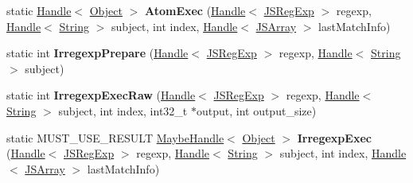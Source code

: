 \begin{DoxyCompactItemize}
\item 
\hypertarget{classv8_1_1internal_1_1_reg_exp_impl_a427c7da5f3edc644caa8f1332d113b11}{}static \hyperlink{classv8_1_1internal_1_1_handle}{Handle}$<$ \hyperlink{classv8_1_1internal_1_1_object}{Object} $>$ {\bfseries Atom\+Exec} (\hyperlink{classv8_1_1internal_1_1_handle}{Handle}$<$ \hyperlink{classv8_1_1internal_1_1_j_s_reg_exp}{J\+S\+Reg\+Exp} $>$ regexp, \hyperlink{classv8_1_1internal_1_1_handle}{Handle}$<$ \hyperlink{classv8_1_1internal_1_1_string}{String} $>$ subject, int index, \hyperlink{classv8_1_1internal_1_1_handle}{Handle}$<$ \hyperlink{classv8_1_1internal_1_1_j_s_array}{J\+S\+Array} $>$ last\+Match\+Info)\label{classv8_1_1internal_1_1_reg_exp_impl_a427c7da5f3edc644caa8f1332d113b11}

\item 
\hypertarget{classv8_1_1internal_1_1_reg_exp_impl_aaae88e8097d51ac38eafb7775de3eb8b}{}static int {\bfseries Irregexp\+Prepare} (\hyperlink{classv8_1_1internal_1_1_handle}{Handle}$<$ \hyperlink{classv8_1_1internal_1_1_j_s_reg_exp}{J\+S\+Reg\+Exp} $>$ regexp, \hyperlink{classv8_1_1internal_1_1_handle}{Handle}$<$ \hyperlink{classv8_1_1internal_1_1_string}{String} $>$ subject)\label{classv8_1_1internal_1_1_reg_exp_impl_aaae88e8097d51ac38eafb7775de3eb8b}

\item 
\hypertarget{classv8_1_1internal_1_1_reg_exp_impl_ac4818db8f6c4a1dad7838d55a54784c0}{}static int {\bfseries Irregexp\+Exec\+Raw} (\hyperlink{classv8_1_1internal_1_1_handle}{Handle}$<$ \hyperlink{classv8_1_1internal_1_1_j_s_reg_exp}{J\+S\+Reg\+Exp} $>$ regexp, \hyperlink{classv8_1_1internal_1_1_handle}{Handle}$<$ \hyperlink{classv8_1_1internal_1_1_string}{String} $>$ subject, int index, int32\+\_\+t $\ast$output, int output\+\_\+size)\label{classv8_1_1internal_1_1_reg_exp_impl_ac4818db8f6c4a1dad7838d55a54784c0}

\item 
\hypertarget{classv8_1_1internal_1_1_reg_exp_impl_a064905c94750360de1eaef77f2fcd813}{}static M\+U\+S\+T\+\_\+\+U\+S\+E\+\_\+\+R\+E\+S\+U\+L\+T \hyperlink{classv8_1_1internal_1_1_maybe_handle}{Maybe\+Handle}$<$ \hyperlink{classv8_1_1internal_1_1_object}{Object} $>$ {\bfseries Irregexp\+Exec} (\hyperlink{classv8_1_1internal_1_1_handle}{Handle}$<$ \hyperlink{classv8_1_1internal_1_1_j_s_reg_exp}{J\+S\+Reg\+Exp} $>$ regexp, \hyperlink{classv8_1_1internal_1_1_handle}{Handle}$<$ \hyperlink{classv8_1_1internal_1_1_string}{String} $>$ subject, int index, \hyperlink{classv8_1_1internal_1_1_handle}{Handle}$<$ \hyperlink{classv8_1_1internal_1_1_j_s_array}{J\+S\+Array} $>$ last\+Match\+Info)\label{classv8_1_1internal_1_1_reg_exp_impl_a064905c94750360de1eaef77f2fcd813}


\end{DoxyCompactItemize}
